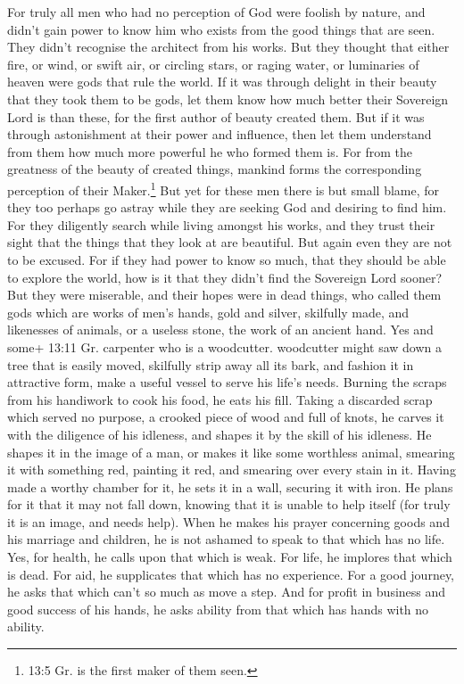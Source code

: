 For truly all men who had no perception of God were foolish
by nature, and didn't gain power to know him who exists from the good
things that are seen. They didn't recognise the architect from his
works.  But they thought that either fire, or wind, or swift
air, or circling stars, or raging water, or luminaries of heaven were
gods that rule the world.  If it was through delight in
their beauty that they took them to be gods, let them know how much
better their Sovereign Lord is than these, for the first author of
beauty created them.  But if it was through astonishment at
their power and influence, then let them understand from them how much
more powerful he who formed them is.  For from the greatness
of the beauty of created things, mankind forms the corresponding
perception of their Maker.\footnote{13:5 Gr. is the first maker of them
  seen.}  But yet for these men there is but small blame,
for they too perhaps go astray while they are seeking God and desiring
to find him.  For they diligently search while living
amongst his works, and they trust their sight that the things that they
look at are beautiful.  But again even they are not to be
excused.  For if they had power to know so much, that they
should be able to explore the world, how is it that they didn't find the
Sovereign Lord sooner?  But they were miserable, and their
hopes were in dead things, who called them gods which are works of men's
hands, gold and silver, skilfully made, and likenesses of animals, or a
useless stone, the work of an ancient hand.  Yes and some+
13:11 Gr. carpenter who is a woodcutter. woodcutter might saw down a
tree that is easily moved, skilfully strip away all its bark, and
fashion it in attractive form, make a useful vessel to serve his life's
needs.  Burning the scraps from his handiwork to cook his
food, he eats his fill.  Taking a discarded scrap which
served no purpose, a crooked piece of wood and full of knots, he carves
it with the diligence of his idleness, and shapes it by the skill of his
idleness. He shapes it in the image of a man,  or makes it
like some worthless animal, smearing it with something red, painting it
red, and smearing over every stain in it.  Having made a
worthy chamber for it, he sets it in a wall, securing it with iron.
 He plans for it that it may not fall down, knowing that it
is unable to help itself (for truly it is an image, and needs help).
 When he makes his prayer concerning goods and his marriage
and children, he is not ashamed to speak to that which has no life.
 Yes, for health, he calls upon that which is weak. For
life, he implores that which is dead. For aid, he supplicates that which
has no experience. For a good journey, he asks that which can't so much
as move a step.  And for profit in business and good
success of his hands, he asks ability from that which has hands with no
ability.

